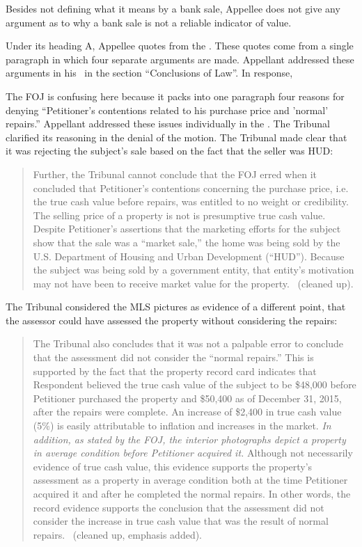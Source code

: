 \documentclass[12pt,\documentclassflag]{michiganCourtOfAppealsBrief}
\begin{document}
Besides not defining what it means by a bank sale, Appellee does not give any argument as to why a bank sale is not a reliable indicator of value.

Under its heading A, Appellee quotes from the \foj[5]. These quotes come from a single paragraph in which four separate arguments are made. Appellant addressed these arguments in his \motionForReconsideration[4-5]\ in the section ``Conclusions of Law''. In response, 

The FOJ is confusing here because it packs into one paragraph four reasons for denying ``Petitioner's contentions related to his purchase price and 'normal' repairs.'' Appellant addressed these issues individually in the \motionForReconsideration[4-5]. The Tribunal clarified its reasoning in the denial of the motion. The Tribunal made clear that it was rejecting the subject's sale based on the fact that the seller was HUD:

\begin{quote}
Further, the Tribunal cannot conclude that the FOJ erred when it
concluded that Petitioner's contentions concerning the purchase price, i.e. the true cash value before repairs, was entitled to no weight or credibility. The selling price of a property is not is presumptive true cash value. Despite Petitioner's assertions that the marketing efforts for the subject show that the sale was a ``market sale,'' the home was
being sold by the U.S. Department of Housing and Urban Development (``HUD''). Because the subject was being sold by a government entity, that entity's motivation may not have been to receive market value for the property. \reconsiderationDenied[2]\ (cleaned up).
\end{quote}

The Tribunal considered the MLS pictures as evidence of a different point, that the assessor could have assessed the property without considering the repairs:

\begin{quote}
  The Tribunal also concludes that it was not a palpable error to conclude that the assessment did not consider the ``normal repairs.'' This is supported by the fact that the property record card indicates that Respondent believed the true cash value of the subject to be \$48,000 before Petitioner purchased the property and \$50,400 as of December 31, 2015, after the repairs were complete. An increase of \$2,400 in true cash value (5\%) is easily attributable to inflation and increases in the market. {\em In addition, as stated by the FOJ, the interior photographs depict a property in average condition before Petitioner acquired it.} Although not necessarily evidence of true cash value, this evidence supports the property's assessment as a property in average condition both at the time Petitioner acquired it and after he completed the normal repairs. In other words, the record evidence supports the conclusion that the assessment did not consider the increase in true cash value that was the result of normal repairs. \reconsiderationDenied[2]\ (cleaned up, emphasis added).
\end{quote}
\end{document}
